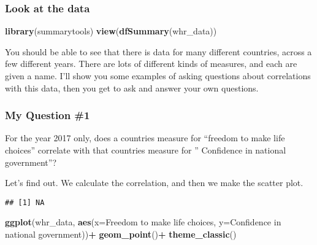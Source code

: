 \documentclass[
]{book}
\newenvironment{Shaded}{\begin{snugshade}}{\end{snugshade}}
\newcommand{\AttributeTok}[1]{\textcolor[rgb]{0.13,0.29,0.53}{#1}}
\newcommand{\FunctionTok}[1]{\textcolor[rgb]{0.13,0.29,0.53}{\textbf{#1}}}
\newcommand{\NormalTok}[1]{#1}
\newcommand{\SpecialCharTok}[1]{\textcolor[rgb]{0.81,0.36,0.00}{\textbf{#1}}}
\newcommand{\StringTok}[1]{\textcolor[rgb]{0.31,0.60,0.02}{#1}}
\begin{document}
\hypertarget{look-at-the-data-1}{%
\subsubsection{Look at the data}\label{look-at-the-data-1}}

\begin{Shaded}
\begin{Highlighting}[]
\FunctionTok{library}\NormalTok{(summarytools)}
\FunctionTok{view}\NormalTok{(}\FunctionTok{dfSummary}\NormalTok{(whr\_data))}
\end{Highlighting}
\end{Shaded}

You should be able to see that there is data for many different countries, across a few different years. There are lots of different kinds of measures, and each are given a name. I'll show you some examples of asking questions about correlations with this data, then you get to ask and answer your own questions.

\hypertarget{my-question-1}{%
\subsubsection{My Question \#1}\label{my-question-1}}

For the year 2017 only, does a countries measure for ``freedom to make life choices'' correlate with that countries measure for '' Confidence in national government''?

Let's find out. We calculate the correlation, and then we make the scatter plot.

\begin{Shaded}
\end{Shaded}

\begin{verbatim}
## [1] NA
\end{verbatim}

\begin{Shaded}
\begin{Highlighting}[]
\FunctionTok{ggplot}\NormalTok{(whr\_data, }\FunctionTok{aes}\NormalTok{(}\AttributeTok{x=}\StringTok{\textasciigrave{}}\AttributeTok{Freedom to make life choices}\StringTok{\textasciigrave{}}\NormalTok{,}
                     \AttributeTok{y=}\StringTok{\textasciigrave{}}\AttributeTok{Confidence in national government}\StringTok{\textasciigrave{}}\NormalTok{))}\SpecialCharTok{+}
  \FunctionTok{geom\_point}\NormalTok{()}\SpecialCharTok{+}
  \FunctionTok{theme\_classic}\NormalTok{()}
\end{Highlighting}
\end{Shaded}
\end{document}
